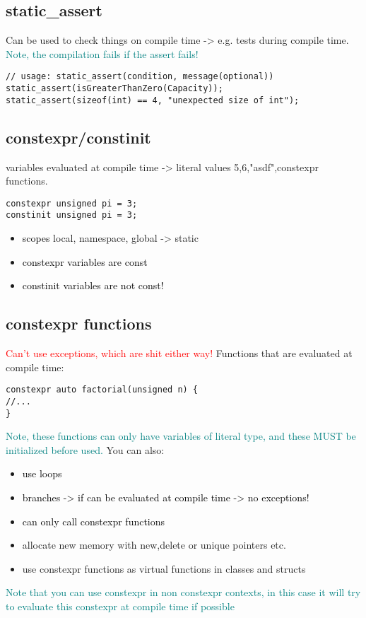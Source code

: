 \documentclass[main.tex,fontsize=8pt,paper=a4,paper=portrait,DIV=calc,]{scrartcl}
\begin{document}
\subsection{static\_assert}
Can be used to check things on compile time -> e.g. tests during compile time.\newline
\textcolor{teal}{Note, the compilation fails if the assert fails!}
\begin{lstlisting}
// usage: static_assert(condition, message(optional))
static_assert(isGreaterThanZero(Capacity));
static_assert(sizeof(int) == 4, "unexpected size of int");
\end{lstlisting}

\subsection{constexpr/constinit}
variables evaluated at compile time -> literal values 5,6,"asdf",constexpr functions.
\begin{lstlisting}
constexpr unsigned pi = 3;
constinit unsigned pi = 3;
\end{lstlisting}
\begin{itemize}
\item \textcolor{black}{scopes}\newline
  local, namespace, global -> static
\item \textcolor{black}{constexpr variables are const}
\item \textcolor{black}{constinit variables are not const!}
\end{itemize} 

\subsection{constexpr functions}
\textcolor{red}{Can't use exceptions, which are shit either way!}\newline
Functions that are evaluated at compile time:
\begin{lstlisting}
constexpr auto factorial(unsigned n) {
//...
}
\end{lstlisting}
\textcolor{teal}{Note, these functions can only have variables of literal type, and these MUST be initialized before used.}\newline
You can also:
\begin{itemize}
\item \textcolor{black}{use loops}
\item \textcolor{black}{branches -> if can be evaluated at compile time -> no exceptions!}
\item \textcolor{black}{can only call constexpr functions}
\item allocate new memory with new,delete or unique pointers etc.
\item use constexpr functions as virtual functions in classes and structs
\end{itemize} 
\textcolor{teal}{Note that you can use constexpr in non constexpr contexts, in this case it will try to evaluate this constexpr at compile time if possible}
\end{document}
